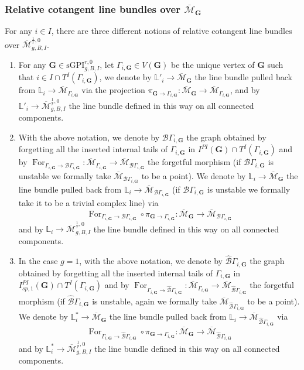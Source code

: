 \documentclass[11pt]{amsart}
\theoremstyle{definition}
\theoremstyle{remark}
\newcommand{\<}{\left<}
\renewcommand{\>}{\right>}
\numberwithin{equation}{section}
\def\Mbar{{\overline{\mathcal M}}}
\def\sGPI{\text{sGPI}}
\begin{document}
\subsubsection{Relative cotangent line bundles over $\Mbar_\mathbf{G}$}\label{sec uni cotangent line over glued moduli}
For any $i\in I$, there are three different notions of relative cotangent line bundles over $\Mbar^{\frac{1}{r},0}_{g,B,I}$.
\begin{enumerate}
    \item 
    For any $\bm{G} \in \sGPI^{r,0}_{g,B,I}$, let $\Gamma_{i,\bm{G}}\in V(\bm{G})$ be the unique vertex of $\bm{G}$ such that $i\in I \cap T^I(\Gamma_{i,\bm{G}})$, we denote by $\mathbb L'_i\to \Mbar_{\bm{G}}$ the line bundle pulled back from $\mathbb L_i\to \Mbar_{\Gamma_{i,\bm{G}}}$ via the projection $\pi_{\bm{G}\to \Gamma_{i,\bm{G}}}\colon \Mbar_{\bm{G}}\to \Mbar_{\Gamma_{i,\bm{G}}}$, and by $\mathbb L'_i\to \Mbar^{\frac{1}{r},0}_{g,B,I}$ the line bundle defined in this way on all connected components.
    \item With the above notation, we denote by $\mathcal B \Gamma_{i,\bm{G}}$ the graph obtained by forgetting all the inserted internal tails of $\Gamma_{i,\bm{G}}$ in $I^{PI}(\bm{G})\cap T^I(\Gamma_{i,\bm{G}})$ and by $\operatorname{For}_{\Gamma_{i,\bm{G}}\to \mathcal B\Gamma_{i,\bm{G}}}\colon \Mbar_{\Gamma_{i,\bm{G}}}\to \Mbar_{\mathcal B \Gamma_{i,\bm{G}}}$ the forgetful morphism (if $\mathcal B \Gamma_{i,\bm{G}}$ is unstable we formally take $\Mbar_{\mathcal B \Gamma_{i,\bm{G}}}$ to be a point). We denote by $\mathbb L_i\to \Mbar_{\bm{G}}$ the line bundle pulled back from $\mathbb L_i\to \Mbar_{\mathcal B\Gamma_{i,\bm{G}}}$ (if $\mathcal B \Gamma_{i,\bm{G}}$ is unstable we formally take it to be a trivial complex line) via 
    $$\operatorname{For}_{\Gamma_{i,\bm{G}}\to \mathcal B\Gamma_{i,\bm{G}}}\circ \pi_{\bm{G}\to \Gamma_{i,\bm{G}}} \colon \Mbar_{\bm{G}} \to \Mbar_{\mathcal B\Gamma_{i,\bm{G}}}$$ 
    and by $\mathbb L_i\to \Mbar^{\frac{1}{r},0}_{g,B,I}$ the line bundle defined in this way on all connected components.

    \item 
    In the case $g=1$, with the above notation, we denote by $\hat{\mathcal B} \Gamma_{i,\bm{G}}$ the graph obtained by forgetting all the inserted internal tails of $\Gamma_{i,\bm{G}}$ in $I^{PI}_{sp,1}(\bm{G})\cap T^I(\Gamma_{i,\bm{G}})$ and by $\operatorname{For}_{\Gamma_{i,\bm{G}}\to \hat{\mathcal B} \Gamma_{i,\bm{G}}}\colon \Mbar_{\Gamma_{i,\bm{G}}}\to \Mbar_{\hat{\mathcal B} \Gamma_{i,\bm{G}}}$ the forgetful morphism (if $\hat{\mathcal B} \Gamma_{i,\bm{G}}$ is unstable, again we formally take $\Mbar_{\hat{\mathcal B} \Gamma_{i,\bm{G}}}$ to be a point). We denote by $\mathbb L^*_i\to \Mbar_{\bm{G}}$ the line bundle pulled back from $\mathbb L_i\to \Mbar_{\hat{\mathcal B} \Gamma_{i,\bm{G}}}$ via 
    $$\operatorname{For}_{\Gamma_{i,\bm{G}}\to \hat{\mathcal B} \Gamma_{i,\bm{G}}}\circ \pi_{\bm{G}\to \Gamma_{i,\bm{G}}} \colon \Mbar_{\bm{G}} \to \Mbar_{\hat{\mathcal B} \Gamma_{i,\bm{G}}}$$ 
    and by $\mathbb L^*_i\to \Mbar^{\frac{1}{r},0}_{g,B,I}$ the line bundle defined in this way on all connected components.
    
    \end{enumerate}
\end{document}
